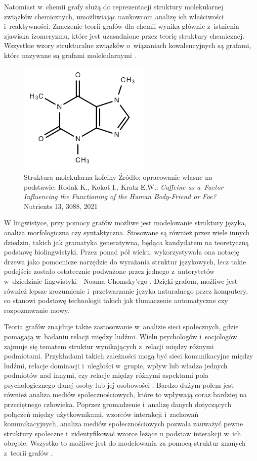 Natomiast w~chemii grafy służą do reprezentacji struktury molekularnej związków chemicznych,
umożliwiając naukowcom analizę ich właściwości i~reaktywności.
Znaczenie teorii grafów dla chemii wynika głównie z~istnienia zjawiska izomeryzmu,
które jest uzasadnione przez teorię struktury chemicznej.
Wszystkie wzory strukturalne związków o~wiązaniach kowalencyjnych są grafami,
które nazywane są grafami molekularnymi \cite{Balaban1985}.

\begin{figure}[ht]
	\centering
	\includegraphics[height=5.5cm]{resources/introduction/images/chem.png}
	\caption{Struktura molekularna kofeiny
		Źródło: opracowanie własne na podstawie:
		Rodak K., Kokot I., Kratz E.W.: \textit{Caffeine as a~Factor Influencing the Functioning of the Human Body-Friend or Foe?} Nutrients 13, 3088, 2021}
    \label{Fig:intro-4}
\end{figure}
\FloatBarrier

W lingwistyce, przy pomocy grafów możliwe jest modelowanie struktury języka, analiza morfologiczna czy syntaktyczna.
Stosowane są również przez wiele innych dziedzin, takich jak gramatyka generatywna,
będąca kandydatem na teoretyczną podstawę biolingwistyki.
Przez ponad pół wieku, wykorzystywała ona notację drzewa jako pomocnicze narzędzie do wyrażania struktur językowych,
lecz takie podejście zostało ostatecznie podważone przez jednego z~autorytetów w~dziedzinie lingwistyki - Noama Chomsky'ego \cite{Arikawa2019}.
Dzięki grafom, możliwe jest również lepsze zrozumienie i~przetwarzanie języka naturalnego przez komputery,
co stanowi podstawę technologii takich jak tłumaczenie automatyczne czy rozpoznawanie mowy.

Teoria grafów znajduje także zastosowanie w~analizie sieci społecznych, gdzie pomagają w~badaniu relacji między ludźmi.
Wielu psychologów i~socjologów zajmuje się tematem struktur wynikających z~relacji między różnymi podmiotami.
Przykładami takich zależności mogą być sieci komunikacyjne między ludźmi, relacje dominacji i~uległości w~grupie,
wpływ lub władza jednych podmiotów nad innymi, czy relacje między różnymi aspektami pola psychologicznego danej osoby lub jej osobowości \cite{Harary1953}.
Bardzo dużym polem jest również analiza mediów społecznościowych, które to wpływają coraz bardziej na przeciętnego człowieka.
Poprzez gromadzenie i~analizę danych dotyczących połączeń między użytkownikami, wzorców interakcji i~zachowań komunikacyjnych,
analiza mediów społecznościowych pozwala zauważyć pewne struktury społeczne i~zidentyfikować wzorce leżące u podstaw interakcji w~ich obrębie.
Wszystko to możliwe jest do modelowania za pomocą struktur znanych z~teorii grafów \cite{Umami2024}.

